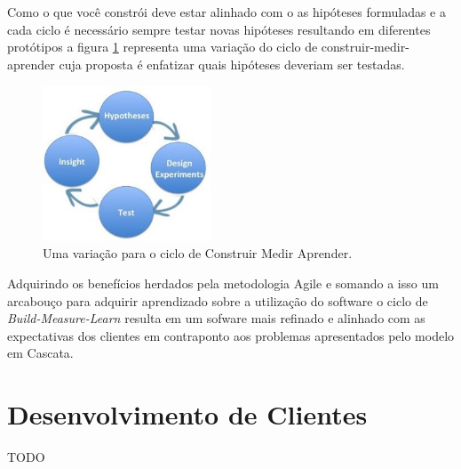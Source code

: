 \par Como o que você constrói deve estar alinhado com o as hipóteses formuladas e a cada ciclo é necessário sempre testar novas hipóteses resultando em diferentes protótipos a figura \ref{fig:hypotheses-experiment} representa uma variação do ciclo de construir-medir-aprender cuja proposta é enfatizar quais hipóteses deveriam ser testadas.
\begin{figure}[htb]
\centering
\includegraphics[width=5cm]{figuras/hypotheses-experiment}
\caption{\label{fig:hypotheses-experiment} Uma variação para o ciclo de Construir Medir Aprender.}
\end{figure}
\par Adquirindo os benefícios herdados pela metodologia Agile e somando a isso um arcabouço para adquirir aprendizado sobre a utilização do software o ciclo de \emph{Build-Measure-Learn} resulta em um sofware mais refinado e alinhado com as expectativas dos clientes em contraponto aos problemas apresentados pelo modelo em Cascata.

\section{Desenvolvimento de Clientes}
TODO
